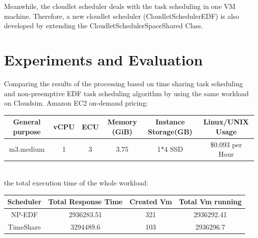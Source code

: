 \documentclass[twocolumn]{article}
\begin{document}
Meanwhile, the cloudlet scheduler deals with the task scheduling in one VM machine. Therefore, a new cloudlet scheduler (CloudletSchedulerEDF) is also developed by extending the CloudletSchedulerSpaceShared Class.

\section{Experiments and Evaluation}
Comparing the results of the processing based on time sharing task scheduling and non-preemptive EDF task scheduling algorithm by using the same workload on Cloudsim.
Amazon EC2 on-demand pricing:\\ 

\begin{tabular}{c|ccccc}
	\hline
General purpose & vCPU & ECU & Memory (GiB) & Instance Storage(GB) &Linux/UNIX Usage\\
\hline
m3.medium & 1 & 3 & 3.75 & 1*4 SSD & \$0.093 per Hour\\
\hline
\end{tabular}\\

the total execution time of the whole workload:
\begin{center}
\begin{tabular}{c|ccc}
	\hline
	Scheduler & Total Response Time & Created Vm &Total Vm running\\ \hline
	NP-EDF & 2936283.51 & 321 &2936292.41\\ \hline
	TimeShare & 3294489.6 & 103 & 2936296.7\\ \hline
\end{tabular}
\end{center}
\end{document}
